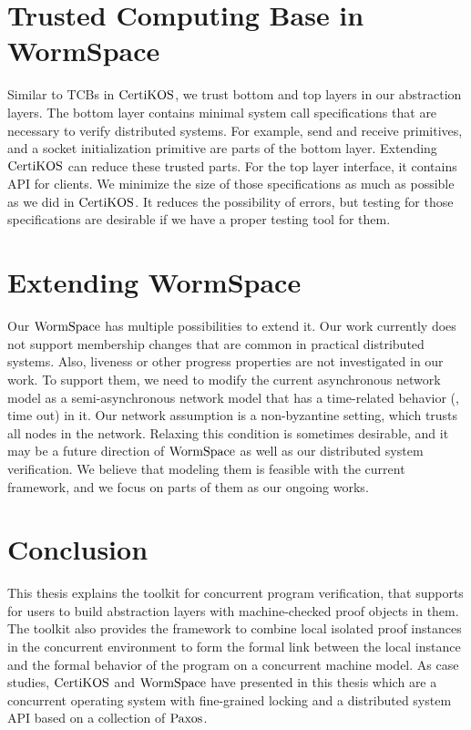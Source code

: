 \section{Trusted Computing Base in WormSpace}

Similar to TCBs in $\mathrm{CertiKOS}$, we trust bottom and top layers in our abstraction layers. 
The bottom layer contains minimal system call specifications that are
necessary to verify distributed systems. 
For example, send and receive primitives, and a socket initialization primitive are parts of the bottom layer. 
Extending $\mathrm{CertiKOS}$ can reduce these trusted parts.
For the top layer interface, it contains API for clients.
We minimize the size of those specifications as much as possible as we did in  $\mathrm{CertiKOS}$.
It reduces the possibility of errors, but testing for those specifications are desirable if we have a proper testing tool for them. 


\section{Extending WormSpace}

Our $\mathrm{WormSpace}$ has multiple possibilities to extend it. 
Our work currently does not support membership changes that are common in practical distributed systems. 
Also, liveness or other progress properties are not investigated in our work. 
To support them, we need to modify the current asynchronous network model as a semi-asynchronous network model that has a time-related behavior (\ie, time out) in it. 
Our network assumption is a non-byzantine setting, which trusts all nodes in the network. 
Relaxing this condition is sometimes desirable, and it may be a future direction of $\mathrm{WormSpace}$ as well as our distributed system verification. 
We believe that modeling them is feasible with the current framework, 
and we focus on parts of them as our ongoing works. 

\section{Conclusion}

This thesis 
explains
the toolkit 
for concurrent program verification, 
that supports for users to build abstraction layers with machine-checked proof objects in them. 
The toolkit also provides 
the framework 
to combine local isolated proof instances in the concurrent environment 
to form the formal link between the local instance and
the formal behavior of the program on a concurrent machine model. 
As case studies, 
$\mathrm{CertiKOS}$ and $\mathrm{WormSpace}$ 
have presented in this thesis
which are a concurrent operating system with fine-grained locking
and a distributed system API 
based on a collection of $\mathrm{Paxos}$. 

